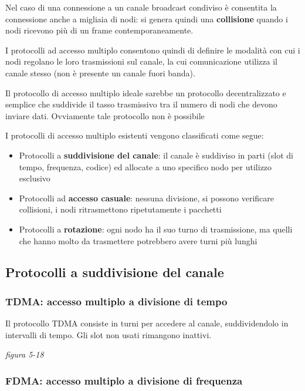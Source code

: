 \documentclass[
]{article}
\begin{document}
Nel caso di una connessione a un canale broadcast condiviso è consentita
la connessione anche a migliaia di nodi: si genera quindi una
\textbf{collisione} quando i nodi ricevono più di un frame
contemporaneamente.

I protocolli ad accesso multiplo consentono quindi di definire le
modalità con cui i nodi regolano le loro trasmissioni sul canale, la cui
comunicazione utilizza il canale stesso (non è presente un canale fuori
banda).

Il protocollo di accesso multiplo ideale sarebbe un protocollo
decentralizzato e semplice che suddivide il tasso trasmissivo tra il
numero di nodi che devono inviare dati. Ovviamente tale protocollo non è
possibile

I protocolli di accesso multiplo esistenti vengono classificati come
segue:

\begin{itemize}
\item
  Protocolli a \textbf{suddivisione del canale}: il canale è suddiviso
  in parti (slot di tempo, frequenza, codice) ed allocate a uno
  specifico nodo per utilizzo esclusivo
\item
  Protocolli ad \textbf{accesso casuale}: nessuna divisione, si possono
  verificare collisioni, i nodi ritrasmettono ripetutamente i pacchetti
\item
  Protocolli a \textbf{rotazione}: ogni nodo ha il suo turno di
  trasmissione, ma quelli che hanno molto da trasmettere potrebbero
  avere turni più lunghi
\end{itemize}

\hypertarget{header-n57}{%
\subsection{Protocolli a suddivisione del canale}\label{header-n57}}

\hypertarget{header-n58}{%
\subsubsection{TDMA: accesso multiplo a divisione di
tempo}\label{header-n58}}

Il protocollo TDMA consiste in turni per accedere al canale,
suddividendolo in intervalli di tempo. Gli slot non usati rimangono
inattivi.

\emph{figura 5-18}

\hypertarget{header-n61}{%
\subsubsection{FDMA: accesso multiplo a divisione di
frequenza}\label{header-n61}}
\end{document}

